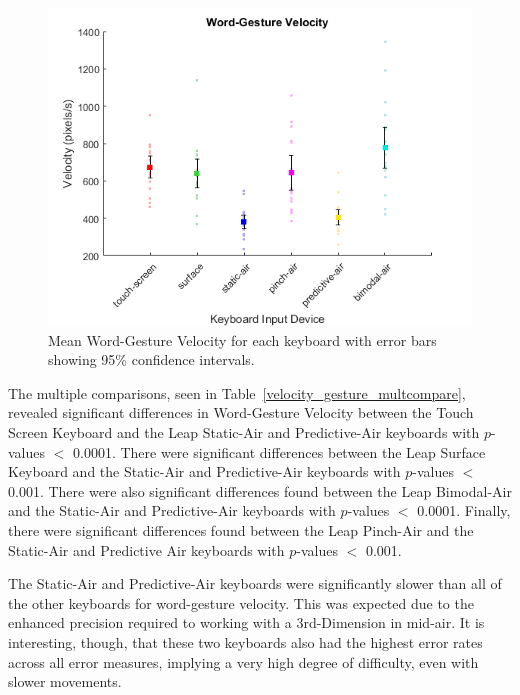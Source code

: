 \begin{figure}[h]
	\centering
	\includegraphics{fig_velocity_gesture_mean}
	\caption[Mean Word-Gesture Velocity]{Mean Word-Gesture Velocity for each keyboard with error bars showing 95\% confidence intervals.}
	\label{fig_velocity_gesture_mean}
\end{figure}

The multiple comparisons, seen in Table~\ref{velocity_gesture_multcompare}, revealed significant differences in Word-Gesture Velocity between the Touch Screen Keyboard and the Leap Static-Air and Predictive-Air keyboards with $p$-values $<$ 0.0001. There were significant differences between the Leap Surface Keyboard and the Static-Air and Predictive-Air keyboards with $p$-values $<$ 0.001. There were also significant differences found between the Leap Bimodal-Air and the Static-Air and Predictive-Air keyboards with $p$-values $<$ 0.0001. Finally, there were significant differences found between the Leap Pinch-Air and the Static-Air and Predictive Air keyboards with $p$-values $<$ 0.001.

The Static-Air and Predictive-Air keyboards were significantly slower than all of the other keyboards for word-gesture velocity. This was expected due to the enhanced precision required to working with a 3rd-Dimension in mid-air. It is interesting, though, that these two keyboards also had the highest error rates across all error measures, implying a very high degree of difficulty, even with slower movements.

